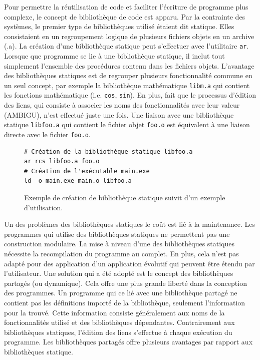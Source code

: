 Pour permettre la réutilisation de code et faciliter
l'écriture de programme plus complexe, le concept de bibliothèque de code est
apparu. Par la contrainte des systèmes, le premier type de bibliothèques utilisé
étaient dit statique.  Elles consistaient en un regroupement logique de
plusieurs fichiers objets en un archive (.a). La création d'une bibliothèque
statique peut s'effectuer avec l'utilitaire \verb|ar|. Lorsque que programme se
lie à une bibliothèque statique, il inclut tout simplement l'ensemble des
procédures contenu dans les fichiers objets. L'avantage des bibliothèques
statiques est de regrouper plusieurs fonctionnalité commune en un seul concept,
par exemple la bibliothèque mathématique \verb|libm.a| qui contient les
fonctions mathématique (i.e. \verb|cos|, \verb|sin|).  En plus,  fait que le
processus d'édition des liens, qui consiste à associer les noms des
fonctionnalités avec leur valeur (AMBIGU), n'est effectué juste une fois. Une
liaison avec une bibliothèque statique \verb|libfoo.a| qui contient le fichier
objet \verb|foo.o| est équivalent à une liaison directe avec le fichier
\verb|foo.o|.

\begin{figure}[ht]
    \begin{minipage}[t]{0.5\textwidth}
\begin{verbatim}
# Création de la bibliothèque statique libfoo.a
ar rcs libfoo.a foo.o
# Création de l'exécutable main.exe
ld -o main.exe main.o libfoo.a
\end{verbatim}
    \end{minipage}

    \caption{Exemple de création de bibliothèque statique suivit d'un exemple
    d'utilisation.}
\end{figure}

Un des problèmes des bibliothèques statiques le coût est lié à la maintenance.  Les
programmes qui utilise des bibliothèques statiques ne permettent pas une
construction modulaire. La mise à niveau d'une des bibliothèques statiques
nécessite la recompilation du programme au complet. En plus, cela n'est pas
adapté pour des application d'un application évolutif qui peuvent être étendu
par l'utilisateur. Une solution qui a été adopté est le
concept des bibliothèques partagés (ou dynamique). Cela offre une plus grande
liberté dans la conception des programmes. Un programme qui ce lié avec une
bibliothèque partagé ne contient pas les définitions importé de la
bibliothèque, seulement l'information pour la trouvé. Cette information
consiste généralement aux noms de la fonctionnalités utilisé et des
bibliothèques dépendantes. Contrairement aux bibliothèques statiques,
l'édition des liens s'effectue à chaque exécution du programme.
Les bibliothèques partagés offre plusieurs avantages par rapport
aux bibliothèques statique.

